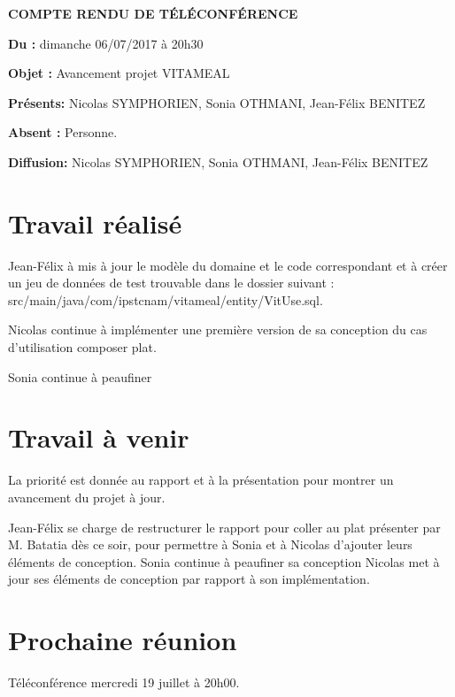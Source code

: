 \documentclass[11pt,a4paper,french,twoside,openright]{article}
\begin{document}
\pagestyle{fancy}

\begin{center}\bfseries\Huge
COMPTE RENDU DE TÉLÉCONFÉRENCE
\end{center}

\textbf{Du      :} dimanche 06/07/2017 à 20h30

\textbf{Objet   :} Avancement projet VITAMEAL

\textbf{Présents:} Nicolas SYMPHORIEN, Sonia OTHMANI, Jean-Félix BENITEZ

\textbf{Absent :} Personne.

\textbf{Diffusion:} Nicolas SYMPHORIEN, Sonia OTHMANI, Jean-Félix BENITEZ

\hrulefill

\section{Travail réalisé}

Jean-Félix à mis à jour le modèle du domaine et le code correspondant et à créer un jeu de données de test trouvable dans le dossier suivant : src/main/java/com/ipstcnam/vitameal/entity/VitUse.sql.

Nicolas continue à implémenter une première version de sa conception du cas d'utilisation composer plat.

Sonia continue à peaufiner 

\section{Travail à venir}

La priorité est donnée au rapport et à la présentation pour montrer un avancement du projet à jour.

Jean-Félix se charge de restructurer le rapport pour coller au plat présenter par M. Batatia dès ce soir, pour permettre à Sonia et à Nicolas d'ajouter leurs éléments de conception.
Sonia continue à peaufiner sa conception
Nicolas met à jour ses éléments de conception par rapport à son implémentation.

\section{Prochaine réunion}
Téléconférence mercredi 19  juillet à 20h00.

\label{LastPage}
\end{document}
